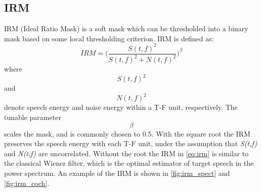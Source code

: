 \subsection{IRM} 
IRM (Ideal Ratio Mask) is a soft mask \cite{ref:irm} which can be thresholded into a binary mask based on some local thresholding criterion. IRM is defined as:
\begin{equation}
IRM = \bigg( \frac{S(t,f)^2}{S(t,f)^2 + N(t,f)^2} \bigg)^\beta
\label{eq:irm}
\end{equation}
where $$S(t,f)^2$$ and $$N(t,f)^2$$ denote speech energy and noise energy within a T-F unit, respectively. The tunable parameter $$\beta$$ scales the mask, and is commonly chosen to 0.5. With the square root the IRM preserves the speech energy with each T-F unit, under the assumption that \textit{S(t,f)} and \textit{N(t,f)} are uncorrelated. Without the root the IRM in \ref{eq:irm} is similar to the classical Wiener filter, which is the optimal estimator of target speech in the power spectrum. An example of the IRM is shown in \ref{fig:irm_spect} and \ref{fig:irm_coch}.



